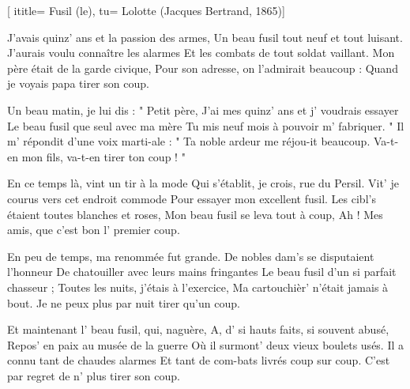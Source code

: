  [
ititle= {Fusil (le)},
tu= {Lolotte (Jacques Bertrand, 1865)}]

\beginverse
J'avais quinz' ans et la passion des armes,
Un beau fusil tout neuf et tout luisant.
J'aurais voulu connaître les alarmes
Et les combats de tout soldat vaillant.
Mon père était de la garde civique,
Pour son adresse, on l'admirait beaucoup :
 {Quand je voyais papa tirer son coup.}
\endverse

\beginverse
Un beau matin, je lui dis : " Petit père,
J'ai mes quinz' ans et j' voudrais essayer
Le beau fusil que seul avec ma mère
Tu mis neuf mois à pouvoir m' fabriquer. "
Il m' répondit d'une voix marti-ale :
" Ta noble ardeur me réjou-it beaucoup.
 {Va-t-en mon fils, va-t-en tirer ton coup ! "}
\endverse

\beginverse
En ce temps là, vint un tir à la mode
Qui s'établit, je crois, rue du Persil.
Vit' je courus vers cet endroit commode
Pour essayer mon excellent fusil.
Les cibl's étaient toutes blanches et roses,
Mon beau fusil se leva tout à coup,
 {Ah ! Mes amis, que c'est bon l' premier coup.}
\endverse

\beginverse
En peu de temps, ma renommée fut grande.
De nobles dam's se disputaient l'honneur
De chatouiller avec leurs mains fringantes
Le beau fusil d'un si parfait chasseur ;
Toutes les nuits, j'étais à l'exercice,
Ma cartouchièr' n'était jamais à bout.
 {Je ne peux plus par nuit tirer qu'un coup.}
\endverse

\beginverse
Et maintenant l' beau fusil, qui, naguère,
A, d' si hauts faits, si souvent abusé,
Repos' en paix au musée de la guerre
Où il surmont' deux vieux boulets usés.
Il a connu tant de chaudes alarmes
Et tant de com-bats livrés coup sur coup.
 {C'est par regret de n' plus tirer son coup.}
\endverse

\endsong
